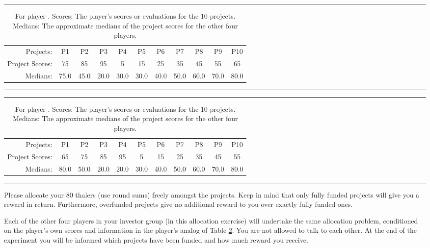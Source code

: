 \documentclass[11pt, oneside]{article}   	%
\begin{document}
\fi
\ifnum{}
\begin{table}[h]
\centering
\rule{\textwidth}{1pt}
\begin{tabular}{r|cccccccccc}
Projects: & P1 & P2 & P3 & P4 & P5 & P6 & P7 & P8 & P9 & P10 \\
Project Scores: & 75 & 85 & 95 & 5 & 15 & 25 & 35 & 45 & 55 & 65 \\
Medians: &75.0 & 45.0 & 20.0 & 30.0 & 30.0 & 40.0 & 50.0 & 60.0 & 70.0 & 80.0 \\
\end{tabular}
\caption{For player \theplayer . Scores: The player's scores or evaluations for the 10 projects. Medians: The approximate medians of the project scores for the other four players.}
\label{fig:scores}
\rule{\textwidth}{1pt}
\end{table}
\fi
\ifnum{}
\begin{table}[h]
\centering
\rule{\textwidth}{1pt}
\begin{tabular}{r|cccccccccc}
Projects: & P1 & P2 & P3 & P4 & P5 & P6 & P7 & P8 & P9 & P10 \\
Project Scores: & 65 & 75 & 85 & 95 & 5 & 15 & 25 & 35 & 45 & 55 \\
Medians: & 80.0 & 50.0 & 20.0 & 20.0 & 30.0 & 40.0 & 50.0 & 60.0 & 70.0 & 80.0 \\
\end{tabular}
\caption{For player \theplayer . Scores: The player's scores or evaluations for the 10 projects. Medians: The approximate medians of the project scores for the other four players.}
\label{fig:scores}
\rule{\textwidth}{1pt}
\end{table}
\fi



Please allocate your 80 thalers (use round sums) freely amongst the projects. Keep in mind that only fully funded projects  will give you a reward in return.
Furthermore, overfunded projects give no additional reward to you over exactly fully funded ones.

Each of the other four players in your investor group (in this allocation exercise) will undertake the same allocation problem, conditioned on the player's own scores and information in the player's analog of Table \ref{fig:scores}. You are not allowed to talk to each other. At the end of the experiment you will be informed which projects have been funded and how much reward you receive.
\end{document}
